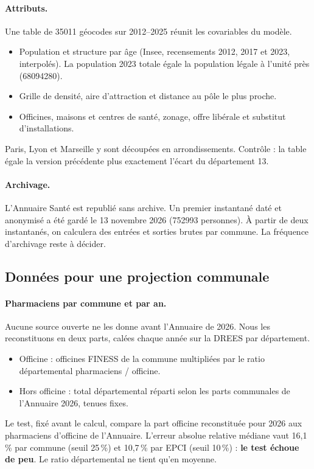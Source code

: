 \documentclass[11pt]{article}
\begin{document}
\paragraph{Attributs.} Une table de \num{35011} géocodes sur 2012--2025 réunit les covariables du modèle.
\begin{itemize}
  \item Population et structure par âge (Insee, recensements 2012, 2017 et 2023, interpolés). La population
  2023 totale égale la population légale à l'unité près (\num{68094280})\mesure{}.
  \item Grille de densité, aire d'attraction et distance au pôle le plus proche.
  \item Officines, maisons et centres de santé, zonage, offre libérale et substitut d'installations.
\end{itemize}
Paris, Lyon et Marseille y sont découpées en arrondissements. Contrôle : la table égale la version précédente plus
exactement l'écart du département 13\mesure{}.

\paragraph{Archivage.} L'Annuaire Santé est republié sans archive. Un premier instantané daté et anonymisé a été
gardé le 13 novembre 2026 (\num{752993} personnes)\mesure{}. À partir de deux instantanés, on calculera des
entrées et sorties brutes par commune. La fréquence d'archivage reste à décider.

\subsection{Données pour une projection communale}\label{sec:res-projcom}
\paragraph{Pharmaciens par commune et par an.} Aucune source ouverte ne les donne avant l'Annuaire de 2026. Nous
les reconstituons en deux parts, calées chaque année sur la DREES par département.
\begin{itemize}
  \item Officine : officines FINESS de la commune multipliées par le ratio départemental pharmaciens / officine.
  \item Hors officine : total départemental réparti selon les parts communales de l'Annuaire 2026, tenues
  fixes\suppose{}.
\end{itemize}
Le test, fixé avant le calcul, compare la part officine reconstituée pour 2026 aux pharmaciens d'officine de
l'Annuaire. L'erreur absolue relative médiane vaut 16,1\,\% par commune (seuil 25\,\%) et 10,7\,\% par
EPCI (seuil 10\,\%)\mesure{} : \textbf{le test échoue de peu}. Le ratio départemental ne tient qu'en moyenne.
\end{document}
